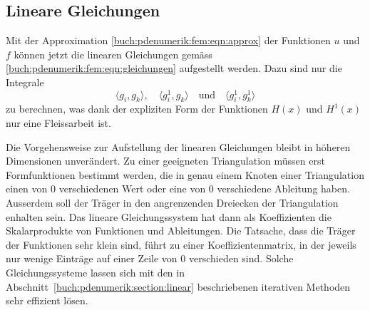 %
%
\subsection{Lineare Gleichungen}
Mit der Approximation \eqref{buch:pdenumerik:fem:eqn:approx} der
Funktionen $u$ und $f$ können jetzt die linearen Gleichungen 
gemäss \eqref{buch:pdenumerik:fem:eqn:gleichungen} aufgestellt werden.
Dazu sind nur die Integrale
\[
\langle g_i,g_k\rangle,\quad
\langle g^1_i,g_k\rangle
\quad \text{und}\quad
\langle g^1_i,g^1_k\rangle
\]
zu berechnen, was dank der expliziten Form der Funktionen $H(x)$ und
$H^1(x)$ nur eine Fleissarbeit ist.

Die Vorgehensweise zur Aufstellung der linearen Gleichungen bleibt
in höheren Dimensionen unverändert.
Zu einer geeigneten Triangulation müssen erst Formfunktionen bestimmt
werden, die in genau einem Knoten einer Triangulation einen von 0
verschiedenen Wert oder eine von 0 verschiedene Ableitung haben.
Ausserdem soll der Träger in den angrenzenden Dreiecken der Triangulation
enhalten sein.
Das lineare Gleichungssystem hat dann als Koeffizienten die Skalarprodukte
von Funktionen und Ableitungen.
Die Tatsache, dass die Träger der Funktionen sehr klein sind, führt
zu einer Koeffizientenmatrix, in der jeweils nur wenige Einträge
auf einer Zeile von 0 verschieden sind.
Solche Gleichungssysteme lassen sich mit den in
Abschnitt~\ref{buch:pdenumerik:section:linear} beschriebenen
iterativen Methoden sehr effizient lösen.
